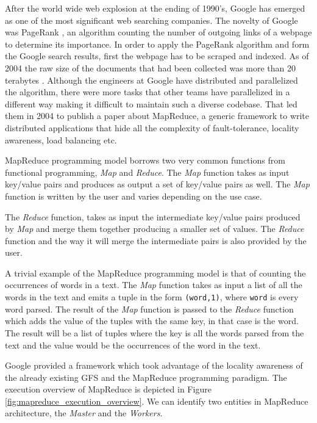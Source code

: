 After the world wide web explosion at the ending of 1990's, Google has
emerged as one of the most significant web searching companies.
The novelty of Google was PageRank \cite{ilprints361}, an
algorithm counting the number of outgoing links of a webpage to determine its
importance. In order to apply the PageRank algorithm and form the
Google search results, first the webpage has to be scraped and
indexed. As of 2004 the raw size of the documents that had been
collected was more than 20 terabytes
\cite{Dean:2004:MSD:1251254.1251264}. Although the engineers at Google
have distributed and parallelized the algorithm, there were more tasks
that other teams have parallelized in a different way making it
difficult to maintain such a diverse codebase. That led them in 2004
to publish a paper about MapReduce, a generic framework to write distributed
applications that hide all the complexity of fault-tolerance, locality
awareness, load balancing etc.

MapReduce programming model borrows two very common functions from
functional programming, \emph{Map} and \emph{Reduce}. The \emph{Map}
function takes as input key/value pairs and produces as output a set
of key/value pairs as well. The \emph{Map} function is written by the
user and varies depending on the use case.

The \emph{Reduce} function, takes as input the
intermediate key/value pairs produced by \emph{Map} and merge them
together producing a smaller set of values. The \emph{Reduce} function
and the way it will merge the intermediate pairs is also provided by
the user.

A trivial example of the MapReduce programming model is that of
counting the occurrences of words in a text. The \emph{Map} function
takes as input a list of all the words in the text and emits a tuple
in the form \texttt{(word,1)}, where \texttt{word} is every word
parsed. The result of the \emph{Map} function is passed to the
\emph{Reduce} function which adds the value of the tuples with the
same key, in that case is the word. The result will be a list of
tuples where the key is all the words parsed from the text and the
value would be the occurrences of the word in the text.

Google provided a framework which took advantage of the locality
awareness of the already existing GFS and the MapReduce programming
paradigm. The execution overview of MapReduce is depicted in Figure
\ref{fig:mapreduce_execution_overview}. We can identify two entities
in MapReduce architecture, the \emph{Master} and the \emph{Workers}.


